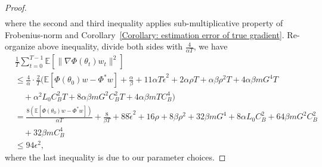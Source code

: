 \documentclass[twoside]{article} %
\theoremstyle{plain}
\theoremstyle{definition}
\theoremstyle{remark}
\newcommand{\tepsilon}{\tilde{\epsilon}}
\begin{document}
\begin{proof}
\begin{align}
\end{align}
where the second and third inequality applies sub-multiplicative property of Frobenius-norm and Corollary~\ref{Corollary: estimation error of true gradient}. 
Re-organize above inequality, divide both sides with $\frac{4}{\alpha T}$, we have
\begin{align}
    &\frac{1}{T}\sum_{t=0}^{T-1}\mathbb{E}[\|\nabla \Phi(\theta_t)w_t \|^2] \nonumber\\
    &\leq \frac{4}{\alpha}\cdot \frac{2}{T}\Big(\mathbb{E}[\Phi(\theta_0)w-\Phi^*w]+\frac{\alpha}{\beta}+{11\alpha T \tepsilon^2}+{2\alpha \rho T}+ \alpha\beta\rho^2T+4\alpha\beta m G^4 T\nonumber\\
    &\quad+ {\alpha^2 L_0 C_B^2T}+{8\alpha\beta mG^2C_B^2T + 4\alpha\beta m T C_B^4}\Big) \nonumber\\
    &= \frac{8(\mathbb{E}[\Phi(\theta_0)w-\Phi^*w])}{\alpha T}+\frac{8}{\beta T}+88\tepsilon^2
    +16\rho+8\beta\rho^2+32\beta m G^4+8\alpha L_0C_B^2+64\beta m G^2C_B^2\nonumber\\
    &\quad +32\beta m C_B^4\nonumber\\
    &\leq 94\epsilon^2,
\end{align}
where the last inequality is due to our parameter choices.
\end{proof}
\end{document}
